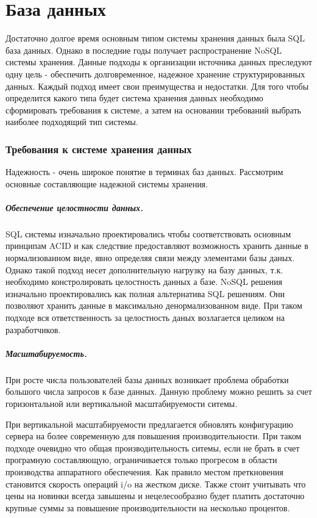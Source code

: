 \section{База данных}
Достаточно долгое время основным типом системы хранения данных была SQL база
данных. Однако в последние годы получает распространение NoSQL системы хранения.
Данные подходы к организации источника данных преследуют одну цель - обеспечить
долговременное, надежное хранение структурированных данных. Каждый подход имеет
свои преимущества и недостатки.
Для того чтобы определится какого типа будет система хранения данных необходимо
сформировать требования к системе, а затем на основании требований выбрать
наиболее подходящий тип системы.

\subsubsection{Требования к системе хранения данных}
Надежность - очень широкое понятие в терминах баз данных. Рассмотрим основные
составляющие надежной системы хранения.
\subparagraph{Обеспечение целостности данных.}
SQL системы изначально проектировались чтобы соответствовать основным принципам
ACID и как следствие предоставляют возможность хранить данные в нормализованном
виде, явно определяя связи между элементами базы даных. Однако такой подход
несет дополнительную нагрузку на базу данных, т.к. необходимо констролировать
целостность данных а базе.
NoSQL решения изначально проектировались как полная альтернатива SQL решениям.
Они позволяют хранить данные в максимально денормализованном виде. При таком
подходе вся ответственность за целостность даных возлагается целиком на
разработчиков.
\subparagraph{Масштабируемость.} 
При росте числа пользователей базы данных возникает проблема обработки большого
числа запросов к базе данных. Данную проблему можно решить за счет
горизонтальной или вертикальной масштабируемости ситемы.

При вертикальной масштабируемости предлагается обновлять конфигурацию сервера на
более современную для повышения производительности. При таком подходе очевидно
что общая производительность ситемы, если не брать в счет програмную
составляющую, ограничивается только прогресом в области производства аппаратного
обеспечения. Как правило местом преткновения становится скорость операций i/o на
жестком диске. Также стоит учитывать что цены на новинки всегда завышены и
нецелесообразно будет платить достаточно крупные суммы за повышение
производительности на несколько процентов.

